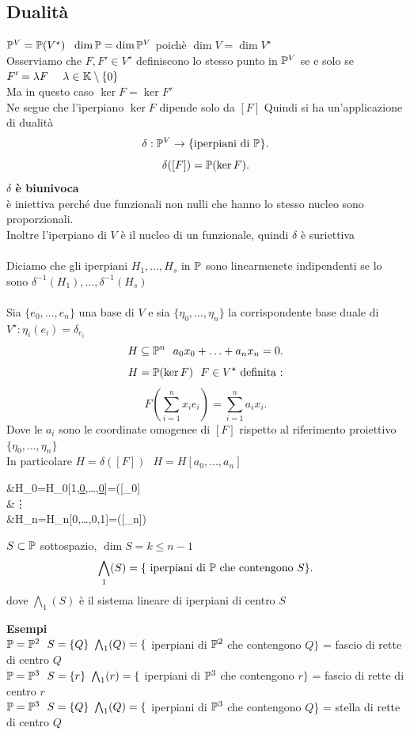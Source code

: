 \documentclass[12px]{article}
\begin{document}
	 \subsection{Dualità}
	 $\pro^V=\pro(V^\star)\ \ \dim\pro=\dim\pro^V$ poichè  $\dim V=\dim V^\star$\\
	 Osserviamo che  $F,F'\in V^\star$ definiscono lo stesso punto in  $\mathbb{P}^V$ se e solo se  \\$F'= \lambda F\ \ \ \ \lambda\in\K\setminus\{0\}$\\
	 Ma in questo caso $\ker F = \ker F'$\\
	 Ne segue che l'iperpiano  $\ker F$ dipende solo da  $[F]$ Quindi si ha un'applicazione di dualità 
	  \[
		  \delta :\mathbb{P}^V \rightarrow \{\text{iperpiani di }\mathbb{P}\}
	 .\] 
	 \[
		 \delta([F]) = \mathbb{P}(\ker F)
	 .\] 
	 \textbf{$\delta$ è biunivoca}\\
	 è iniettiva perché due funzionali non nulli che hanno lo stesso nucleo sono proporzionali.\\
	 Inoltre l'iperpiano di $V$ è il nucleo di un funzionale, quindi  $\delta$ è suriettiva\\
	 \ \hline \ \\
	 Diciamo che gli iperpiani $H_1,\ldots,H_s$ in $\mathbb{P}$ sono linearmenete indipendenti se lo sono $\delta^{-1}(H_1),\ldots,\delta^{-1}(H_s)$ \ \\ \hline \ \\
	 Sia $\{e_0,\ldots,e_n\}$ una base di $V$ e sia $\{\eta_0,\ldots,\eta_n\}$ la corrispondente base duale di $V^\star:\eta_i(e_i)=\delta_{e_i}$ 
	 \[
	 H\subseteq \pro^n \ \ a_0x_0+\ldots+a_nx_n=0
	 .\] 
\[
	H = \mathbb{P}(\ker F) \ \ F\in V^\star \text{ definita :}
\] 
\[
F(\sum^n_{i=1}x_ie_i)=\sum^n_{i=1}a_ix_i
.\] 
Dove le $a_i$ sono le coordinate omogenee di  $[F] $ rispetto al riferimento proiettivo  $\{\eta_0,\ldots,\eta_n\}$\\
In particolare $H=\delta([F]) \ \ \ H=H[a_0,\ldots,a_n]$ \\
\begin{aligend}
	&H_0=H_0[1,\underline{0},\ldots,\underline{0}]=\delta([\eta_0]\\
	&\vdots\\
	&H_n=H_n[0,\ldots,0,1]=\delta([\eta_n])
\end{aligend}
\begin{defi}
	$S\subset \mathbb{P}$ sottospazio,  $\dim S = k \leq n-1$
	\[
		\bigwedge_1(S) = \{\text{ iperpiani di }\mathbb{P} \text{ che contengono } S\}
	.\] 
	dove $\bigwedge_1(S)$ è il sistema lineare di iperpiani di centro $S$
\end{defi}
\textbf{Esempi}\\
$\mathbb{P}=\mathbb{P}^2 \ \ S = \{Q\}\ \ \\
\bigwedge_1(Q) = \{$ iperpiani di $\mathbb{P}^2$  che contengono $Q\}$ = fascio di rette di centro $Q$\\
$\mathbb{P}=\mathbb{P}^3 \ \ S = \{r\}\ \ \\ \bigwedge_1(r) = \{$ iperpiani di $\mathbb{P}^3$ che contengono $r\}$ = fascio di rette di centro $r$\\
$\mathbb{P}=\mathbb{P}^3 \ \ S = \{Q\}\ \ \\ \bigwedge_1(Q) = \{$ iperpiani di $\mathbb{P}^3$ che contengono $Q$\} = stella di rette di centro $Q$\\
\end{document}
